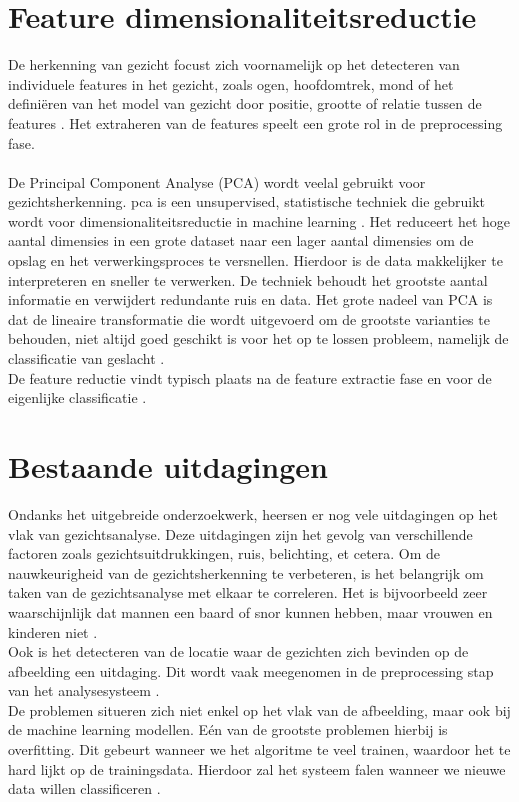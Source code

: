 \section{Feature dimensionaliteitsreductie} \label{sec:featuredimred}
De herkenning van gezicht focust zich voornamelijk op het detecteren van individuele features in het gezicht, zoals ogen, hoofdomtrek, mond of het definiëren van het model van gezicht door positie, grootte of relatie tussen de features \autocite{Lin2006}. Het extraheren van de features speelt een grote rol in de preprocessing fase. \\
\\
De Principal Component Analyse (PCA) wordt veelal gebruikt voor gezichtsherkenning. \gls{pca} is een unsupervised, statistische techniek die gebruikt wordt voor dimensionaliteitsreductie in machine learning \autocite{SalihHasan2021}. Het reduceert het hoge aantal dimensies in een grote dataset naar een lager aantal dimensies om de opslag en het verwerkingsproces te versnellen. Hierdoor is de data makkelijker te interpreteren en sneller te verwerken. De techniek behoudt het grootste aantal informatie en verwijdert redundante ruis en data. Het grote nadeel van PCA is dat de lineaire transformatie die wordt uitgevoerd om de grootste varianties te behouden, niet altijd goed geschikt is voor het op te lossen probleem, namelijk de classificatie van geslacht \autocite{Wang2010}. \\
De feature reductie vindt typisch plaats na de feature extractie fase en voor de eigenlijke classificatie \autocite{Lakshmiprabha2016}.

\section{Bestaande uitdagingen} \label{sec:uitdagingen}
Ondanks het uitgebreide onderzoekwerk, heersen er nog vele uitdagingen op het vlak van gezichtsanalyse. Deze uitdagingen zijn het gevolg van verschillende factoren zoals gezichtsuitdrukkingen, ruis, belichting, et cetera. Om de nauwkeurigheid van de gezichtsherkenning te verbeteren, is het belangrijk om taken van de gezichtsanalyse met elkaar te correleren. Het is bijvoorbeeld zeer waarschijnlijk dat mannen een baard of snor kunnen hebben, maar vrouwen en kinderen niet \autocite{Siddiqi2022}. 
\\
Ook is het detecteren van de locatie waar de gezichten zich bevinden op de afbeelding een uitdaging. Dit wordt vaak meegenomen in de preprocessing stap van het analysesysteem \autocite{Jiang2008}.
\\
De problemen situeren zich niet enkel op het vlak van de afbeelding, maar ook bij de machine learning modellen. Eén van de grootste problemen hierbij is overfitting. Dit gebeurt wanneer we het algoritme te veel trainen, waardoor het te hard lijkt op de trainingsdata. Hierdoor zal het systeem falen wanneer we nieuwe data willen classificeren \autocite{Coppens2018}.

